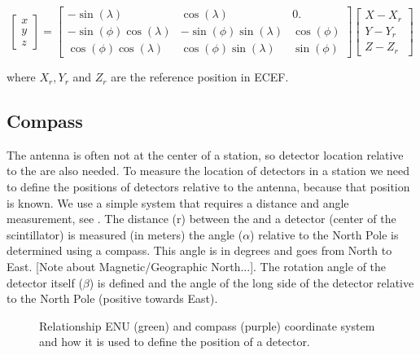 \begin{equation}
    \begin{bmatrix}
    x \\ y \\ z
    \end{bmatrix}
    = 
    \begin{bmatrix}
                   -\sin(\lambda) &             \cos(\lambda) &         0. \\
        -\sin(\phi) \cos(\lambda) & -\sin(\phi) \sin(\lambda) & \cos(\phi) \\
         \cos(\phi) \cos(\lambda) &  \cos(\phi) \sin(\lambda) & \sin(\phi)
    \end{bmatrix}
    \begin{bmatrix}
    X - X_r \\ Y - Y_r \\ Z - Z_r
    \end{bmatrix}
\end{equation}

where $X_r, Y_r$ and $Z_r$ are the reference position in ECEF.



\subsection{Compass}

The \gps antenna is often not at the center of a station, so detector
location relative to the \gps are also needed. To measure the location
of detectors in a station we need to define the positions of detectors
relative to the \gps antenna, because that position is known. We use a
simple system that requires a distance and angle measurement, see
. The distance (r) between the \gps and a
detector (center of the scintillator) is measured (in meters) the angle
($\alpha$) relative to the North Pole is determined using a compass.
This angle is in degrees and goes from North to East. [Note about
Magnetic/Geographic North...]. The rotation angle of the detector itself
($\beta$) is defined and the angle of the long side of the detector
relative to the North Pole (positive towards East).

\begin{figure}
    \centering
    
    \caption{Relationship ENU (green) and compass (purple) coordinate system
             and how it is used to define the position of a detector.}
    \label{fig:enu_compass}
\end{figure}

